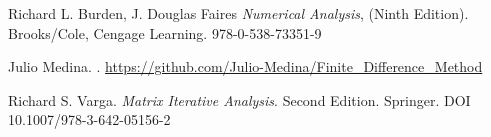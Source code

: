 \documentclass[a4paper]{article}
\begin{document}
\begin{thebibliography}{99}


 Richard L. Burden, J. Douglas Faires \textit{Numerical Analysis}, (Ninth Edition). Brooks/Cole, Cengage Learning. 978-0-538-73351-9

 Julio Medina. . \url{https://github.com/Julio-Medina/Finite_Difference_Method}

 Richard S. Varga. \textit{Matrix Iterative Analysis}. Second Edition. Springer. DOI 10.1007/978-3-642-05156-2






\end{thebibliography}
\end{document}
